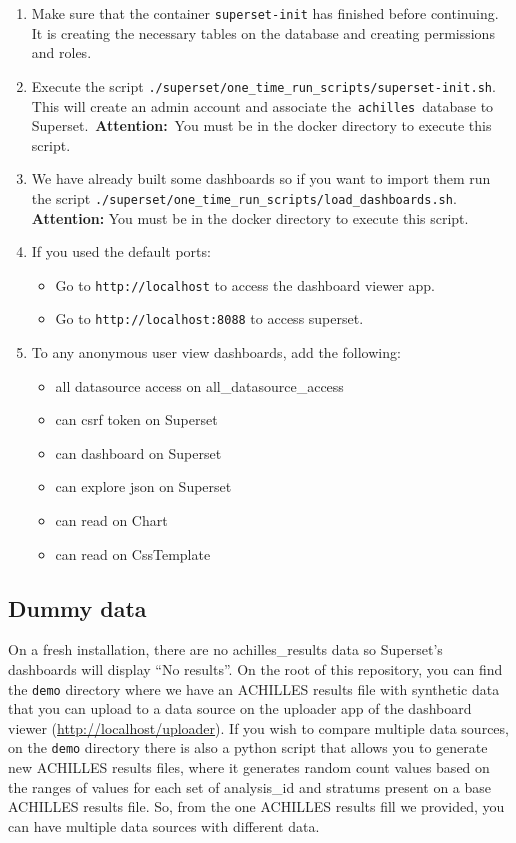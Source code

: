 \documentclass[
]{book}
\providecommand{\tightlist}{%
  \setlength{\itemsep}{0pt}\setlength{\parskip}{0pt}}
\begin{document}
\begin{enumerate}
\def\labelenumi{\arabic{enumi}.}
\item
  Make sure that the container \texttt{superset-init} has finished before continuing. It is creating the necessary tables on the database and creating permissions and roles.
\item
  Execute the script \texttt{./superset/one\_time\_run\_scripts/superset-init.sh}. This will create an admin account and associate the~\texttt{achilles}~database to Superset.~\textbf{Attention:}~You must be in the docker directory to execute this script.
\item
  We have already built some dashboards so if you want to import them run the script \texttt{./superset/one\_time\_run\_scripts/load\_dashboards.sh}. \textbf{Attention:} You must be in the docker directory to execute this script.
\item
  If you used the default ports:

  \begin{itemize}
  \tightlist
  \item
    Go to \texttt{http://localhost} to access the dashboard viewer app.
  \item
    Go to \texttt{http://localhost:8088} to access superset.
  \end{itemize}
\item
  To any anonymous user view dashboards, add the following:

  \begin{itemize}
  \tightlist
  \item
    all datasource access on all\_datasource\_access
  \item
    can csrf token on Superset
  \item
    can dashboard on Superset
  \item
    can explore json on Superset
  \item
    can read on Chart
  \item
    can read on CssTemplate
  \end{itemize}
\end{enumerate}

\hypertarget{dummy-data}{%
\subsection*{Dummy data}\label{dummy-data}}

On a fresh installation, there are no achilles\_results data so Superset's dashboards will display ``No results''. On the root of this repository, you can find the \texttt{demo} directory where we have an ACHILLES results file with synthetic data that you can upload to a data source on the uploader app of the dashboard viewer (\url{http://localhost/uploader}). If you wish to compare multiple data sources, on the \texttt{demo} directory there is also a python script that allows you to generate new ACHILLES results files, where it generates random count values based on the ranges of values for each set of analysis\_id and stratums present on a base ACHILLES results file. So, from the one ACHILLES results fill we provided, you can have multiple data sources with different data.
\end{document}
